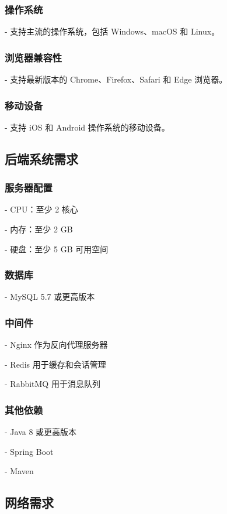 \subsubsection{操作系统}
- 支持主流的操作系统，包括 Windows、macOS 和 Linux。

\subsubsection{浏览器兼容性}
- 支持最新版本的 Chrome、Firefox、Safari 和 Edge 浏览器。

\subsubsection{移动设备}
- 支持 iOS 和 Android 操作系统的移动设备。

\subsection{后端系统需求}
\subsubsection{服务器配置}
- CPU：至少 2 核心

- 内存：至少 2 GB

- 硬盘：至少 5 GB 可用空间

\subsubsection{数据库}
- MySQL 5.7 或更高版本

\subsubsection{中间件}
- Nginx 作为反向代理服务器

- Redis 用于缓存和会话管理

- RabbitMQ 用于消息队列

\subsubsection{其他依赖}
- Java 8 或更高版本

- Spring Boot

- Maven

\subsection{网络需求}

